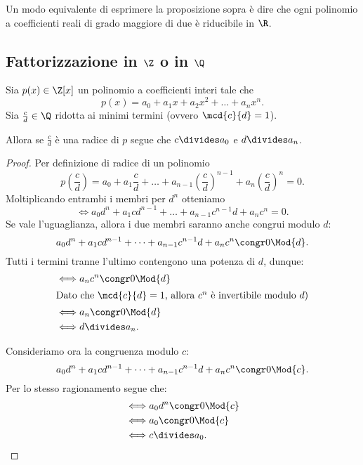 Un modo equivalente di esprimere la proposizione sopra è dire che ogni polinomio a coefficienti reali di grado maggiore di due è riducibile in $\R$.

\subsection{Fattorizzazione in $\Z$ o in $\Q$}

\begin{proposition}
    Sia $p(x) \in \Z[x]$ un polinomio a coefficienti interi tale che \[
        p(x) = a_0 + a_1x + a_2x^2 + \dots + a_nx^n.    
    \] Sia $\frac{c}{d} \in \Q$ ridotta ai minimi termini (ovvero $\mcd{c}{d} = 1$). 
    
    Allora se $\frac{c}{d}$ è una radice di $p$ segue che $c \divides a_0$ e $d \divides a_n$.
\end{proposition}
\begin{proof}
    Per definizione di radice di un polinomio \[
        p\left(\frac{c}{d}\right) = a_0 + a_1\frac{c}{d} + \dots + a_{n-1}\left(\frac{c}{d}\right)^{n-1} + a_n\left(\frac{c}{d}\right)^n = 0.
    \]
    Moltiplicando entrambi i membri per $d^n$ otteniamo \[
        \iff a_0d^n + a_1cd^{n-1} + \dots + a_{n-1}c^{n-1}d + a_nc^n = 0.
    \]
    Se vale l'uguaglianza, allora i due membri saranno anche congrui modulo $d$: \[
        a_0d^n + a_1cd^{n-1} + \dots + a_{n-1}c^{n-1}d + a_nc^n \congr 0 \Mod{d}.
    \]
    Tutti i termini tranne l'ultimo contengono una potenza di $d$, dunque:
    \begin{align*}
        \iff &a_nc^n \congr 0 \Mod{d} \\
        \intertext{Dato che $\mcd{c}{d} = 1$, allora $c^n$ è invertibile modulo $d$)}
        \iff &a_n \congr 0 \Mod{d}\\
        \iff &d \divides a_n.
    \end{align*}

    Consideriamo ora la congruenza modulo $c$: \[
        a_0d^n + a_1cd^{n-1} + \dots + a_{n-1}c^{n-1}d + a_nc^n \congr 0 \Mod{c}.
    \]
    Per lo stesso ragionamento segue che:
    \begin{align*}
        \iff &a_0d^n \congr 0 \Mod{c}\\
        \iff &a_0 \congr 0 \Mod{c} \\
        \iff &c \divides a_0. \qedhere
    \end{align*}
\end{proof}

